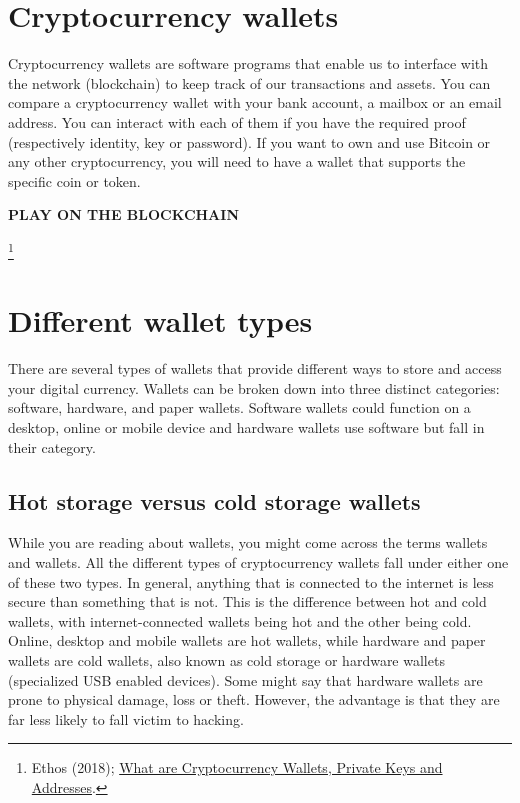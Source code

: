 \section{Cryptocurrency wallets}
Cryptocurrency wallets are software programs that enable us to interface with the network (blockchain) to keep track of our transactions and assets. You can compare a cryptocurrency wallet with your bank account, a mailbox or an email address. You can interact with each of them if you have the required proof (respectively identity, key or password). If you want to own and use Bitcoin or any other cryptocurrency, you will need to have a wallet that supports the specific coin or token. 

\medskip
\begin{cryptobox}{\textbf{PLAY ON THE BLOCKCHAIN}}

     \footnote{Ethos (2018); \href{https://www.ethos.io/what-are-cryptocurrency-wallet-private-keys-addresses/}{What are Cryptocurrency Wallets, Private Keys and Addresses}.}

    \end{cryptobox}

\section{Different wallet types}
There are several types of wallets that provide different ways to store and access your digital currency. Wallets can be broken down into three distinct categories: software, hardware, and paper wallets. Software wallets could function on a desktop, online or mobile device and hardware wallets use software but fall in their category.

\medskip

\subsection{Hot storage versus cold storage wallets}
While you are reading about wallets, you might come across the terms  wallets and  wallets. All the different types of cryptocurrency wallets fall under either one of these two types.
In general, anything that is connected to the internet is less secure than something that is not. This is the difference between hot and cold wallets, with internet-connected wallets being hot and the other being cold. Online, desktop and mobile wallets are hot wallets, while hardware and paper wallets are cold wallets, also known as cold storage or hardware wallets (specialized USB enabled devices). Some might say that hardware wallets are prone to physical damage, loss or theft. However, the advantage is that they are far less likely to fall victim to hacking.

